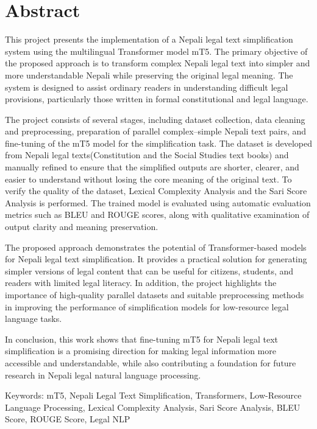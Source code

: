 \documentclass[12pt]{report}
\begin{document}
\newpage
\chapter*{Abstract}
This project presents the implementation of a Nepali legal text simplification system using the multilingual Transformer model mT5. The primary objective of the proposed approach is to transform complex Nepali legal text into simpler and more understandable Nepali while preserving the original legal meaning. The system is designed to assist ordinary readers in understanding difficult legal provisions, particularly those written in formal constitutional and legal language.

The project consists of several stages, including dataset collection, data cleaning and preprocessing, preparation of parallel complex–simple Nepali text pairs, and fine-tuning of the mT5 model for the simplification task. The dataset is developed from Nepali legal texts(Constitution and the Social Studies text books) and manually refined to ensure that the simplified outputs are shorter, clearer, and easier to understand without losing the core meaning of the original text. To verify the quality of the dataset, Lexical Complexity Analysis and the Sari Score Analysis is performed. The trained model is evaluated using automatic evaluation metrics such as BLEU and ROUGE scores, along with qualitative examination of output clarity and meaning preservation.

The proposed approach demonstrates the potential of Transformer-based models for Nepali legal text simplification. It provides a practical solution for generating simpler versions of legal content that can be useful for citizens, students, and readers with limited legal literacy. In addition, the project highlights the importance of high-quality parallel datasets and suitable preprocessing methods in improving the performance of simplification models for low-resource legal language tasks.

In conclusion, this work shows that fine-tuning mT5 for Nepali legal text simplification is a promising direction for making legal information more accessible and understandable, while also contributing a foundation for future research in Nepali legal natural language processing.

Keywords: mT5, Nepali Legal Text Simplification, Transformers, Low-Resource Language Processing, Lexical Complexity Analysis, Sari Score Analysis, BLEU Score, ROUGE Score, Legal NLP
\end{document}
